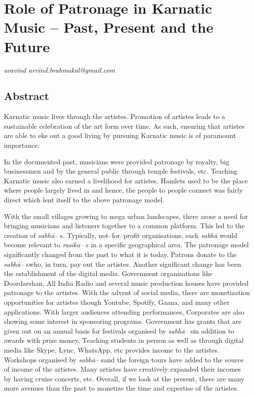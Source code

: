 
\chapter{Role of Patronage in Karnatic Music – Past, Present and the Future}\label{chapter8}


\begin{flushright}
\textit{aravind arvind.brahmakal@gmail.com} 
\end{flushright}


\section*{Abstract}

Karnatic music lives through the artistes. Promotion of artistes leads to a sustainable celebration of the art form over time. As such, ensuring that artistes are able to eke out a good living by pursuing Karnatic music is of paramount importance.

In the documented past, musicians were provided patronage by royalty, big businessmen and by the general public through temple festivals, etc. Teaching Karnatic music also earned a livelihood for artistes. Hamlets used to be the place where people largely lived in and hence, the people to people connect was fairly direct which lent itself to the above patronage model.

With the small villages growing to mega urban landscapes, there arose a need for bringing musicians and listeners together to a common platform. This led to the creation of \textit{sabhā–} s. Typically, not–for–profit organisations, each \textit{sabhā} would become relevant to\textit{ rasika–} s in a specific geographical area. The patronage model significantly changed from the past to what it is today. Patrons donate to the \textit{sabhā–} swho, in turn, pay out the artistes. Another significant change has been the establishment of the digital media. Government organisations like Doordarshan, All India Radio and several music production houses have provided patronage to the artistes. With the advent of social media, there are monetization opportunities for artistes though Youtube, Spotify, Gaana, and many other applications. With larger audiences attending performances, Corporates are also showing some interest in sponsoring programs. Government has grants that are given out on an annual basis for festivals organised by \textit{sabhā–} sin addition to awards with prize money. Teaching students in person as well as through digital media like Skype, Lync, WhatsApp, etc provides income to the artistes. Workshops organised by \textit{sabhā–} sand the foreign tours have added to the source of income of the artistes. Many artistes have creatively expanded their incomes by having cruise concerts, etc. Overall, if we look at the present, there are many more avenues than the past to monetize the time and expertise of the artistes.

